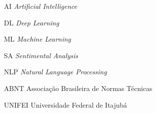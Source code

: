 \renewcommand{\nomname}{\listadesiglasname}
\pdfbookmark[0]{\nomname}{las}
\cleardoublepage
\begin{siglas}
	\item[AI] \textit{Artificial Intelligence}
	\item[DL] \textit{Deep Learning}
	\item[ML] \textit{Machine Learning}
	\item[SA] \textit{Sentimental Analysis}
	\item[NLP] \textit{Natural Language Processing}
	\item[ABNT] Associação Brasileira de Normas Técnicas
	\item[UNIFEI] Universidade Federal de Itajubá

\end{siglas}